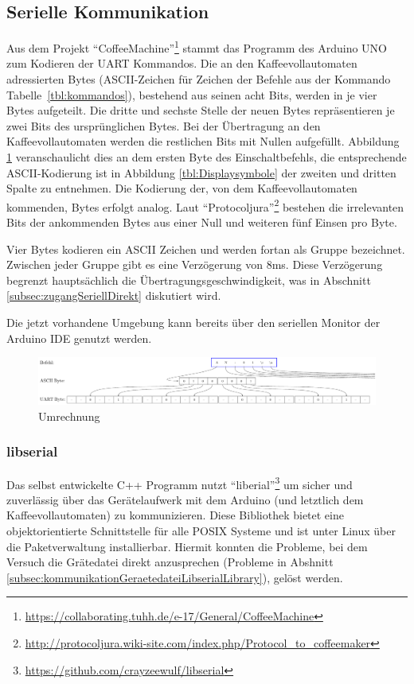 \subsection{Serielle Kommunikation}\label{subsec:SerielleKommunikation}
Aus dem Projekt "`CoffeeMachine"'\footnote{\label{GitlabProject_CoffeeMachine}\url{https://collaborating.tuhh.de/e-17/General/CoffeeMachine}} stammt das Programm des Arduino UNO zum Kodieren der \ac{UART} Kommandos.
Die an den Kaffeevollautomaten adressierten Bytes (ASCII-Zeichen für Zeichen der Befehle aus der Kommando Tabelle~\ref{tbl:kommandos}), bestehend aus seinen acht Bits, werden in je vier Bytes aufgeteilt.
Die dritte und sechste Stelle der neuen Bytes repräsentieren je zwei Bits des ursprünglichen Bytes.
Bei der Übertragung an den Kaffeevollautomaten werden die restlichen Bits mit Nullen aufgefüllt.
Abbildung \ref{fig:uart} veranschaulicht dies an dem ersten Byte des Einschaltbefehls, die entsprechende ASCII-Kodierung ist in Abbildung \ref{tbl:Displaysymbole} der zweiten und dritten Spalte zu entnehmen.
Die Kodierung der, von dem Kaffeevollautomaten kommenden, Bytes erfolgt analog.
Laut "`Protocoljura"'\footnote{\url{http://protocoljura.wiki-site.com/index.php/Protocol_to_coffeemaker}} bestehen die irrelevanten Bits der ankommenden Bytes aus einer Null und weiteren fünf Einsen pro Byte.

Vier Bytes kodieren ein ASCII Zeichen und werden fortan als Gruppe bezeichnet.
Zwischen jeder Gruppe gibt es eine Verzögerung von 8ms.
Diese Verzögerung begrenzt hauptsächlich die Übertragungsgeschwindigkeit, was in Abschnitt \ref{subsec:zugangSeriellDirekt} diskutiert wird.

Die jetzt vorhandene Umgebung kann bereits über den seriellen Monitor der Arduino IDE genutzt werden.

\begin{figure}
  \begin{center}
    \includegraphics[scale=0.4]{images/UART-Bytes}
    \caption{Umrechnung }
    \label{fig:uart}
  \end{center}
\end{figure}

\subsubsection{libserial}
Das selbst entwickelte C++ Programm nutzt "`liberial"'\footnote{\url{https://github.com/crayzeewulf/libserial}} um sicher und zuverlässig über das Gerätelaufwerk mit dem Arduino (und letztlich dem Kaffeevollautomaten) zu kommunizieren.
Diese Bibliothek bietet eine objektorientierte Schnittstelle für alle \ac{POSIX} Systeme und ist unter Linux über die Paketverwaltung installierbar.
Hiermit konnten die Probleme, bei dem Versuch die Grätedatei direkt anzusprechen (Probleme in Abshnitt \ref{subsec:kommunikationGeraetedateiLibserialLibrary}), gelöst werden.

